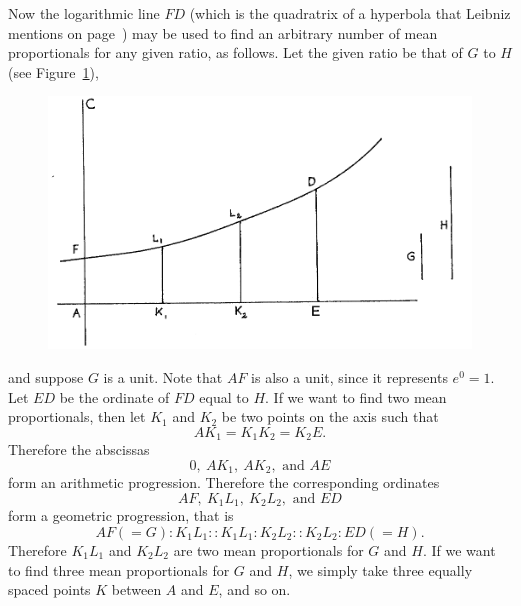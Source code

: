 \documentclass[polutonikogreek,english,twoside,openright]{article}
\begin{document}
Now the logarithmic line $FD$ (which is the quadratrix of a hyperbola that Leibniz mentions on page~\pageref{logtrans}) may be used to find an arbitrary number of mean proportionals for any given ratio, as follows.  Let the given ratio be that of $G$ to $H$ (see Figure~\ref{meanprops}),
\begin{figure}[htp]
\begin{center}
\includegraphics[width=\textwidth]{fig/Figure53}
\caption{}
\label{meanprops}
\vspace{-10pt}
\end{center}
\end{figure} 
 and suppose $G$ is a unit.  Note that $AF$ is also a unit, since it represents $e^0 = 1$.  Let $ED$ be the ordinate of $FD$ equal to $H$.  If we want to find two mean proportionals, then let $K_1$ and $K_2$ be two points on the axis such that
$$AK_1 = K_1K_2 = K_2E.$$
Therefore the abscissas
$$0,\ AK_1,\ AK_2,\mbox{ and }AE$$
form an arithmetic progression.  Therefore the corresponding ordinates
$$AF,\ K_1L_1,\ K_2L_2,\mbox{ and }ED$$
form a geometric progression, that is
$$AF(=G) \!:\! K_1L_1 :: K_1L_1 \!:\! K_2L_2 :: K_2L_2 \!:\! ED (=H).$$
Therefore $K_1L_1$ and $K_2L_2$ are two mean proportionals for $G$ and $H$.  If we want to find three mean proportionals for $G$ and $H$, we simply take three equally spaced points $K$ between $A$ and $E$, and so on.   
\end{document}
